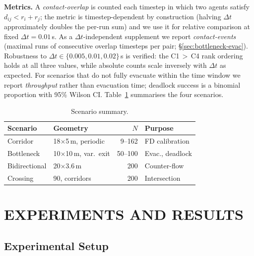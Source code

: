 \documentclass[a4paper,twoside]{article}
\begin{document}
\textbf{Metrics.}
A \emph{contact-overlap} is counted each timestep in which two agents satisfy $d_{ij}<r_i{+}r_j$; the metric is timestep-dependent by construction (halving $\Delta t$ approximately doubles the per-run sum) and we use it for relative comparison at fixed $\Delta t{=}0.01$\,s. As a $\Delta t$-independent supplement we report \emph{contact-events} (maximal runs of consecutive overlap timesteps per pair; \S\ref{sec:bottleneck-evac}). Robustness to $\Delta t\in\{0.005,0.01,0.02\}$\,s is verified: the C1\,$>$\,C4 rank ordering holds at all three values, while absolute counts scale inversely with $\Delta t$ as expected. For scenarios that do not fully evacuate within the time window we report \emph{throughput} rather than evacuation time; deadlock success is a binomial proportion with 95\% Wilson CI. Table~\ref{tab:scenarios} summarises the four scenarios.

\begin{table}[h]
\caption{Scenario summary.}\label{tab:scenarios}
\centering\scriptsize
\begin{tabular}{@{}llrl@{}}
\toprule
\textbf{Scenario} & \textbf{Geometry} & $N$ & \textbf{Purpose} \\
\midrule
Corridor & 18$\times$5\,m, periodic & 9--162 & FD calibration \\
Bottleneck & 10$\times$10\,m, var.\ exit & 50--100 & Evac., deadlock \\
Bidirectional & 20$\times$3.6\,m & 200 & Counter-flow \\
Crossing & 90\textdegree{}, corridors & 200 & Intersection \\
\bottomrule
\end{tabular}
\end{table}


\section{\uppercase{Experiments and Results}}
\label{sec:experiments}

\subsection{Experimental Setup}
\label{sec:setup}
\end{document}
